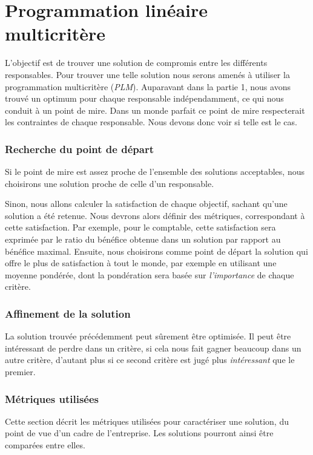 \part{Programmation linéaire multicritère}

L'objectif est de trouver une solution de compromis entre les différents responsables.
Pour trouver une telle solution nous serons amenés à utiliser la programmation multicritère (\emph{PLM}).
Auparavant dans la partie 1, nous avons trouvé un optimum pour chaque
responsable indépendam\-ment, ce qui nous conduit à un point de mire. Dans un
monde parfait ce point de mire respecterait les contraintes de chaque
responsable. Nous devons donc voir si telle est le cas. 


\section{Recherche du point de départ}
Si le point de mire est assez proche de l'ensemble des solutions acceptables,
nous choisirons une solution proche de celle d'un responsable.

Sinon, nous allons calculer la satisfaction de chaque objectif, sachant qu'une
solution a été retenue. Nous devrons alors définir des métriques, correspondant
à cette satisfaction. Par exemple, pour le comptable, cette satisfaction sera
exprimée par le ratio du bénéfice obtenue dans un solution par rapport au
bénéfice maximal.
Ensuite, nous choisirons comme point de départ la solution qui offre le plus de
satisfaction à tout le monde, par exemple en utilisant une moyenne pondérée,
dont la pondération sera basée sur \emph{l'importance} de chaque critère.

\section{Affinement de la solution}
La solution trouvée précédemment peut sûrement être optimisée. Il peut être
intéressant de perdre dans un critère, si cela nous fait gagner beaucoup dans
un autre critère, d'autant plus si ce second critère est jugé plus
\emph{intéressant} que le premier.

\section{Métriques utilisées}
Cette section décrit les métriques utilisées pour caractériser une solution, du
point de vue d'un cadre de l'entreprise. Les solutions pourront ainsi être
comparées entre elles.

